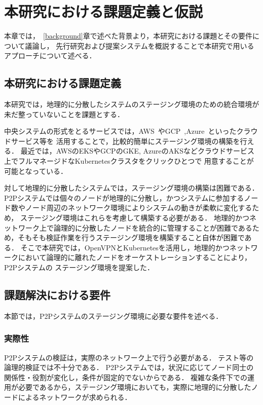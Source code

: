 \chapter{本研究における課題定義と仮説}
\label{issue}

本章では，~\ref{background}章で述べた背景より，本研究における課題とその要件について議論し，
先行研究および提案システムを概説することで本研究で用いるアプローチについて述べる．

\section{本研究における課題定義}
\label{issue:definition}

本研究では，地理的に分散したシステムのステージング環境のための統合環境が未だ整っていないことを課題とする．

中央システムの形式をとるサービスでは，AWS~\cite{AWS}やGCP~\cite{GCP},Azure~\cite{Azure}といったクラウドサービス等を
活用することで，比較的簡単にステージング環境の構築を行える．
最近では，AWSのEKSやGCPのGKE, AzureのAKSなどクラウドサービス上でフルマネージドなKubernetesクラスタをクリックひとつで
用意することが可能となっている．

対して地理的に分散したシステムでは，ステージング環境の構築は困難である．
P2Pシステムでは個々のノードが地理的に分散し，かつシステムに参加するノード数やノード周辺のネットワーク環境によりシステムの動きが柔軟に変化するため，
ステージング環境はこれらを考慮して構築する必要がある．
地理的かつネットワーク上で論理的に分散したノードを統合的に管理することが困難であるため，そもそも検証作業を行うステージング環境を構築すること自体が困難である．
そこで本研究では，OpenVPNとKubernetesを活用し，地理的かつネットワークにおいて論理的に離れたノードをオーケストレーションすることにより，P2Pシステムの
ステージング環境を提案した．

\section{課題解決における要件}
\label{issue:requirements}
本節では，P2Pシステムのステージング環境に必要な要件を述べる．

\subsection{実際性}
\label{issue:requirements1}
P2Pシステムの検証は，実際のネットワーク上で行う必要がある．
テスト等の論理的検証では不十分である．
P2Pシステムでは，状況に応じてノード同士の関係性・役割が変化し，条件が固定的でないからである．
複雑な条件下での運用が必要であるから，ステージング環境においても，実際に地理的に分散したノードによるネットワークが求められる．

